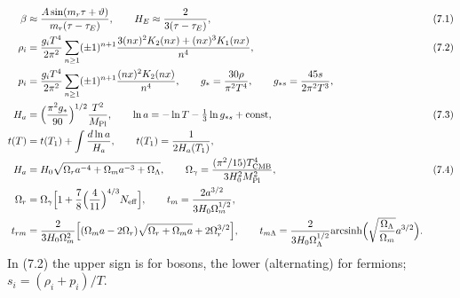 \documentclass[10pt,a4paper]{article}
\begin{document}
\begin{align*}
\beta&\approx\frac{A\sin(m_r\tau+\vartheta)}{m_r(\tau-\tau_E)},\qquad H_E\approx\frac2{3(\tau-\tau_E)},&&(7.1) \\
\rho_i&=\frac{g_iT^4}{2\pi^2}\sum_{n\ge1}(\pm1)^{n+1}\frac{3(nx)^2K_2(nx)+(nx)^3K_1(nx)}{n^4},&&(7.2) \\
p_i&=\frac{g_iT^4}{2\pi^2}\sum_{n\ge1}(\pm1)^{n+1}\frac{(nx)^2K_2(nx)}{n^4},\qquad g_*=\frac{30\rho}{\pi^2T^4},\qquad g_{*s}=\frac{45s}{2\pi^2T^3}, \\
H_a&=\Big(\frac{\pi^2g_*}{90}\Big)^{1/2}\frac{T^2}{M_{\rm Pl}},\qquad \ln a=-\ln T-\tfrac13\ln g_{*s}+\text{const},&&(7.3) \\
t(T)&=t(T_1)+\int\frac{d\ln a}{H_a},\qquad t(T_1)=\frac1{2H_a(T_1)}, \\
H_a&=H_0\sqrt{\Omega_ra^{-4}+\Omega_ma^{-3}+\Omega_\Lambda},\qquad \Omega_\gamma=\frac{(\pi^2/15)T_{\rm CMB}^4}{3H_0^2M_{\rm Pl}^2},&&(7.4) \\
\Omega_r&=\Omega_\gamma\Big[1+\frac78\Big(\frac4{11}\Big)^{4/3}N_{\rm eff}\Big],\qquad t_m=\frac{2a^{3/2}}{3H_0\Omega_m^{1/2}}, \\
t_{rm}&=\frac2{3H_0\Omega_m^2}\Big[(\Omega_ma-2\Omega_r)\sqrt{\Omega_r+\Omega_ma}+2\Omega_r^{3/2}\Big],\qquad t_{m\Lambda}=\frac2{3H_0\Omega_\Lambda^{1/2}}\mathrm{arcsinh}\Big(\sqrt{\frac{\Omega_\Lambda}{\Omega_m}}a^{3/2}\Big).
\end{align*}
In (7.2) the upper sign is for bosons, the lower (alternating) for fermions; $s_i=(\rho_i+p_i)/T$.
\end{document}

